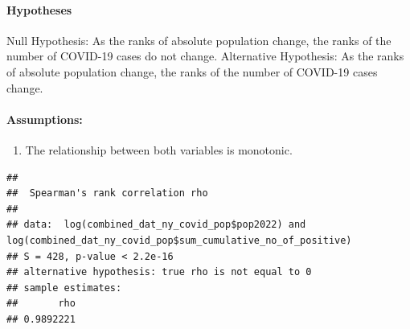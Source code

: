 \documentclass[
  12pt,
]{article}
\newenvironment{Shaded}{\begin{snugshade}}{\end{snugshade}}
\newcommand{\AttributeTok}[1]{\textcolor[rgb]{0.77,0.63,0.00}{#1}}
\newcommand{\CommentTok}[1]{\textcolor[rgb]{0.56,0.35,0.01}{\textit{#1}}}
\newcommand{\FunctionTok}[1]{\textcolor[rgb]{0.00,0.00,0.00}{#1}}
\newcommand{\NormalTok}[1]{#1}
\newcommand{\OtherTok}[1]{\textcolor[rgb]{0.56,0.35,0.01}{#1}}
\newcommand{\SpecialCharTok}[1]{\textcolor[rgb]{0.00,0.00,0.00}{#1}}
\newcommand{\StringTok}[1]{\textcolor[rgb]{0.31,0.60,0.02}{#1}}
\providecommand{\tightlist}{%
  \setlength{\itemsep}{0pt}\setlength{\parskip}{0pt}}
\begin{document}
\hypertarget{hypotheses}{%
\paragraph{Hypotheses}\label{hypotheses}}

Null Hypothesis: As the ranks of absolute population change, the ranks
of the number of COVID-19 cases do not change. Alternative Hypothesis:
As the ranks of absolute population change, the ranks of the number of
COVID-19 cases change.

\hypertarget{assumptions}{%
\paragraph{Assumptions:}\label{assumptions}}

\begin{enumerate}
\def\labelenumi{\arabic{enumi}.}
\tightlist
\item
  The relationship between both variables is monotonic.
\end{enumerate}

\begin{Shaded}
\end{Shaded}

\begin{verbatim}
## 
##  Spearman's rank correlation rho
## 
## data:  log(combined_dat_ny_covid_pop$pop2022) and log(combined_dat_ny_covid_pop$sum_cumulative_no_of_positive)
## S = 428, p-value < 2.2e-16
## alternative hypothesis: true rho is not equal to 0
## sample estimates:
##       rho 
## 0.9892221
\end{verbatim}
\end{document}
